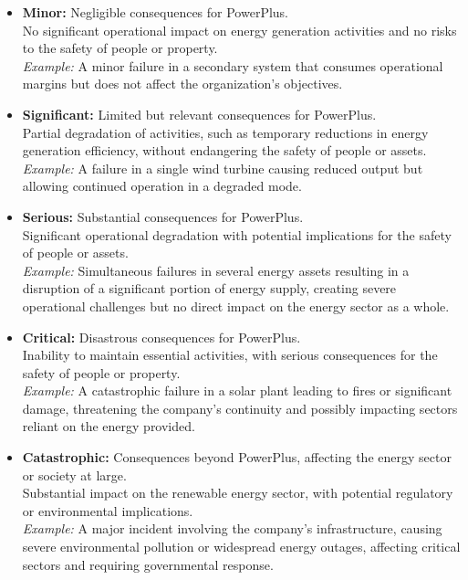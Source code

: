 \begin{itemize}
    \item \textbf{Minor:} Negligible consequences for PowerPlus. \\
    No significant operational impact on energy generation activities and no risks to the safety of people or property. \\
    \textit{Example:} A minor failure in a secondary system that consumes operational margins but does not affect the organization’s objectives.
    
    \item \textbf{Significant:} Limited but relevant consequences for PowerPlus. \\
    Partial degradation of activities, such as temporary reductions in energy generation efficiency, without endangering the safety of people or assets. \\
    \textit{Example:} A failure in a single wind turbine causing reduced output but allowing continued operation in a degraded mode.
    
    \item \textbf{Serious:} Substantial consequences for PowerPlus. \\
    Significant operational degradation with potential implications for the safety of people or assets. \\
    \textit{Example:} Simultaneous failures in several energy assets resulting in a disruption of a significant portion of energy supply, creating severe operational challenges but no direct impact on the energy sector as a whole.
    
    \item \textbf{Critical:} Disastrous consequences for PowerPlus. \\
    Inability to maintain essential activities, with serious consequences for the safety of people or property. \\
    \textit{Example:} A catastrophic failure in a solar plant leading to fires or significant damage, threatening the company’s continuity and possibly impacting sectors reliant on the energy provided.
    
    \item \textbf{Catastrophic:} Consequences beyond PowerPlus, affecting the energy sector or society at large. \\
    Substantial impact on the renewable energy sector, with potential regulatory or environmental implications. \\
    \textit{Example:} A major incident involving the company’s infrastructure, causing severe environmental pollution or widespread energy outages, affecting critical sectors and requiring governmental response.
\end{itemize}


